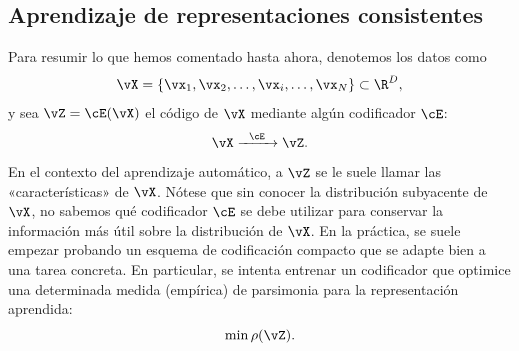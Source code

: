 \documentclass[../../book-main_es.tex]{subfiles}
\begin{document}
\subsection{Aprendizaje de representaciones consistentes}

\label{sec:consistency}

Para resumir lo que hemos comentado hasta ahora, denotemos los datos como
\begin{equation}
    \vX = \{\vx_{1}, \vx_{2}, \ldots, \vx_{i}, \ldots, \vx_{N}\} \subset \R^{D},
\end{equation}
y sea \(\vZ = \cE(\vX)\) el código de \(\vX\) mediante algún codificador \(\cE\):
\begin{equation}
    \vX  \xrightarrow{\hspace{2mm} \cE\hspace{2mm}} \vZ.
    \label{eqn:open-loop}
\end{equation}
En el contexto del aprendizaje automático, a \(\vZ\) se le suele llamar las
«características» de \(\vX\). Nótese que sin conocer la distribución subyacente
de \(\vX\), no sabemos qué codificador \(\cE\) se debe
utilizar para conservar la información más útil sobre la distribución
de \(\vX\). En la práctica, se suele empezar probando un
esquema de codificación compacto que se adapte bien a una tarea concreta.
En particular, se intenta entrenar un codificador que optimice una determinada 
medida (empírica) de parsimonia para la representación aprendida:
\begin{equation}
    \min \rho(\vZ).
\end{equation}
\end{document}
